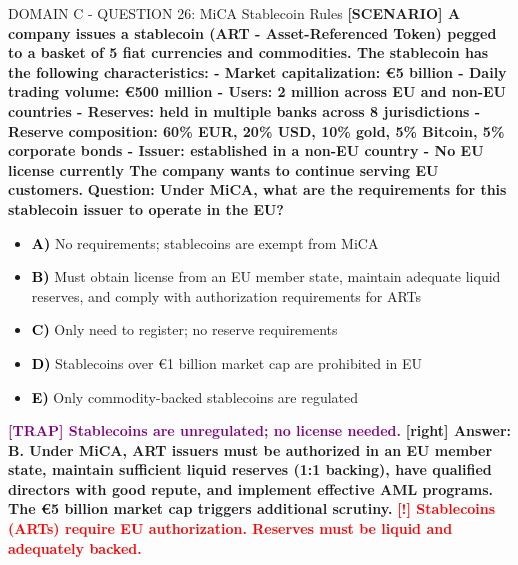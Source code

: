 \documentclass[11pt,a4paper]{beamer}
\newcommand{\redflag}[1]{\textcolor{red}{\textbf{[!] #1}}}
\newcommand{\trap}[1]{\textcolor{purple}{\textbf{[TRAP] #1}}}
\newcommand{\correct}[1]{\textcolor{green!50!black}{\textbf{[right] #1}}}
\newcommand{\scenario}[1]{\textcolor{blue!70!black}{\textbf{[SCENARIO] #1}}}
\newcommand{\option}[1]{\textcolor{black}{\textbf{#1}}}
\begin{document}
\begin{frame}{DOMAIN C - QUESTION 26: MiCA Stablecoin Rules}
\scenario{A company issues a stablecoin (ART - Asset-Referenced Token) pegged to a basket of 5 fiat currencies and commodities. The stablecoin has the following characteristics:
- Market capitalization: €5 billion
- Daily trading volume: €500 million
- Users: 2 million across EU and non-EU countries
- Reserves: held in multiple banks across 8 jurisdictions
- Reserve composition: 60\% EUR, 20\% USD, 10\% gold, 5\% Bitcoin, 5\% corporate bonds
- Issuer: established in a non-EU country
- No EU license currently
The company wants to continue serving EU customers.}
\vspace{0.2cm}
\textbf{Question: Under MiCA, what are the requirements for this stablecoin issuer to operate in the EU?}
\vspace{0.1cm}
\begin{itemize}
    \item \option{A)} No requirements; stablecoins are exempt from MiCA
    \item \option{B)} Must obtain license from an EU member state, maintain adequate liquid reserves, and comply with authorization requirements for ARTs
    \item \option{C)} Only need to register; no reserve requirements
    \item \option{D)} Stablecoins over €1 billion market cap are prohibited in EU
    \item \option{E)} Only commodity-backed stablecoins are regulated
\end{itemize}
\vspace{0.2cm}
\trap{Stablecoins are unregulated; no license needed.}
\correct{Answer: B. Under MiCA, ART issuers must be authorized in an EU member state, maintain sufficient liquid reserves (1:1 backing), have qualified directors with good repute, and implement effective AML programs. The €5 billion market cap triggers additional scrutiny.}
\redflag{Stablecoins (ARTs) require EU authorization. Reserves must be liquid and adequately backed.}
\end{frame}
\end{document}
